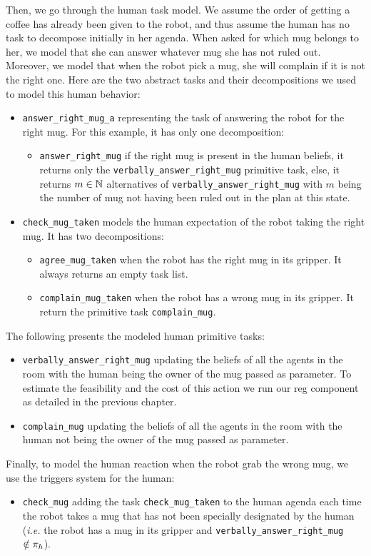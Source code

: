 \documentclass[a4paper,11pt,twoside]{StyleThese}
\begin{document}
Then, we go through the human task model. We assume the order of getting a coffee has already been given to the robot, and thus assume the human has no task to decompose initially in her agenda. When asked for which mug belongs to her, we model that she can answer whatever mug she has not ruled out. Moreover, we model that when the robot pick a mug, she will complain if it is not the right one. Here are the two abstract tasks and their decompositions we used to model this human behavior:
\begin{itemize}
\item \verb'answer_right_mug_a' representing the task of answering the robot for the right mug. For this example, it has only one decomposition:
	\begin{itemize}
	\item \verb'answer_right_mug' if the right mug is present in the human beliefs, it returns only the \verb'verbally_answer_right_mug' primitive task, else, it returns $m \in \mathbb{N}$ alternatives of \verb'verbally_answer_right_mug' with $m$ being the number of mug not having been ruled out in the plan at this state.
	\end{itemize}
\item \verb'check_mug_taken' models the human expectation of the robot taking the right mug. It has two decompositions:
	\begin{itemize}
	\item \verb'agree_mug_taken' when the robot has the right mug in its gripper. It always returns an empty task list.
	\item \verb'complain_mug_taken' when the robot has a wrong mug in its gripper. It return the primitive task \verb'complain_mug'.
	\end{itemize}
\end{itemize}
The following presents the modeled human primitive tasks:
\begin{itemize}
\item \verb'verbally_answer_right_mug' updating the beliefs of all the agents in the room with the human being the owner of the mug passed as parameter. To estimate the feasibility and the cost of this action we run our \acrshort{reg} component as detailed in the previous chapter. 
\item \verb'complain_mug' updating the beliefs of all the agents in the room with the human not being the owner of the mug passed as parameter.
\end{itemize}
Finally, to model the human reaction when the robot grab the wrong mug, we use the triggers system for the human:
\begin{itemize}
\item \verb'check_mug' adding the task \verb'check_mug_taken' to the human agenda each time the robot takes a mug that has not been specially designated by the human (\textit{i.e.} the robot has a mug in its gripper and \verb'verbally_answer_right_mug'~$\notin \pi_h$).
\end{itemize}
\end{document}
